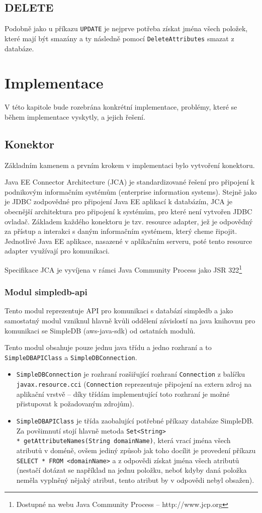 \documentclass[oneside,11pt]{fithesis2}
\begin{document}
\section{DELETE}
Podobně jako u příkazu \verb<UPDATE< je nejprve potřeba získat jména všech položek, které mají být smazány a ty následně pomocí \verb<DeleteAttributes< smazat z databáze.
\chapter{Implementace}
V této kapitole bude rozebrána konkrétní implementace, problémy, které se během implementace vyskytly, a jejich řešení.
\section{Konektor}
Základním kamenem a prvním krokem v implementaci bylo vytvoření konektoru.

Java EE Connector Architecture (JCA) je standardizované řešení pro připojení k podnikovým informačním systémům (enterprise information systems). Stejně jako je JDBC zodpovědné pro připojení Java EE aplikací k databázím, JCA je obecnější architektura pro připojení k systémům, pro které není vytvořen JDBC ovladač. Základem každého konektoru je tzv. resource adapter, jež je odpovědný za přístup a interakci s daným informačním systémem, který cheme řipojit. Jednotlivé Java EE aplikace, nasazené v aplikačním serveru, poté tento resource adapter využívají pro komunikaci. 

Specifikace JCA je vyvíjena v rámci Java Community Process jako JSR 322\footnote{Dostupné na webu Java Community Process -- http://www.jcp.org}
\subsection*{Modul simpledb-api}
Tento modul reprezentuje API pro komunikaci s databází simpledb a jako samostatný modul vzniknul hlavně kvůli oddělení závislostí na java knihovnu pro komunikaci se SimpleDB (aws-java-sdk) od ostatních modulů.

Tento modul obsahuje pouze jednu java třídu a jedno rozhraní a to \verb<SimpleDBAPIClass< a \verb<SimpleDBConnection<.
\begin{itemize}
 \item \verb<SimpleDBConnection< je rozhraní rozšiřující rozhraní \verb<Connection< z balíčku \verb<javax.resource.cci< (\verb<Connection< reprezentuje připojení na extern zdroj na aplikační vrstvě -- díky třídám implementující toto rozhraní je možné přistupovat k požadovaným zdrojům).
 \item \verb<SimpleDBAPIClass< je třída zaobalující potřebné příkazy databáze SimpleDB. Za povšimnutí stojí hlavně metoda \texttt{Set<String> \\* getAttributeNames(String domainName)}, která vrací jména všech atributů v doméně, ovšem jediný způsob jak toho docílit je provedení příkazu \texttt{SELECT * FROM <domainName>} a z odpovědi získat jména všech atributů (nestačí dotázat se například na jednu položku, neboť kdyby daná položka neměla vyplněný nějaký atribut, tento atribut by v odpovědi nebyl obsažen).
\end{itemize}
\end{document}
